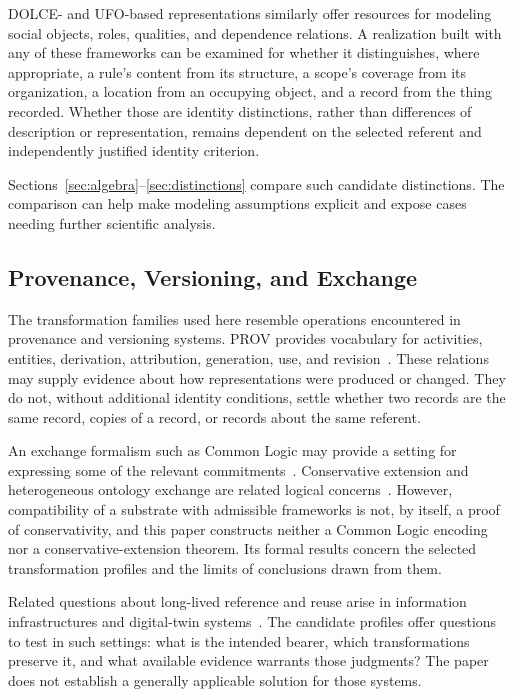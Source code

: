 DOLCE- and UFO-based representations similarly offer resources for
modeling social objects, roles, qualities, and dependence relations.
A realization built with any of these frameworks can be examined for
whether it distinguishes, where appropriate, a rule's content from its
structure, a scope's coverage from its organization, a location from
an occupying object, and a record from the thing recorded.
Whether
those are identity distinctions, rather than differences of description
or representation, remains dependent on the selected referent and
independently justified identity criterion.

Sections~\ref{sec:algebra}--\ref{sec:distinctions} compare such candidate
distinctions.
The comparison can help make modeling assumptions explicit and expose
cases needing further scientific analysis.

\subsection{Provenance, Versioning, and Exchange}
\label{subsec:related_provenance_exchange}

The transformation families used here resemble operations encountered
in provenance and versioning systems.
PROV provides vocabulary for
activities, entities, derivation, attribution, generation, use, and
revision~\citep{provdm2013}.
These relations may supply evidence about
how representations were produced or changed.
They do not, without
additional identity conditions, settle whether two records are the
same record, copies of a record, or records about the same referent.

An exchange formalism such as Common Logic may provide a setting for
expressing some of the relevant commitments~\citep{isoiec24707}.
Conservative extension and heterogeneous ontology exchange are
related logical concerns~\citep{hodges1997,kutz2010}.
However,
compatibility of a substrate with admissible frameworks is not, by
itself, a proof of conservativity, and this paper constructs neither
a Common Logic encoding nor a conservative-extension theorem.
Its formal results concern the selected transformation profiles and
the limits of conclusions drawn from them.

Related questions about long-lived reference and reuse arise in
information infrastructures and digital-twin systems~\citep{edwards2011,grieves2016}.
The candidate profiles offer questions to test in such settings:
what is the intended bearer, which transformations preserve it,
and what available evidence warrants those judgments?
The paper does not establish a generally applicable solution for
those systems.

